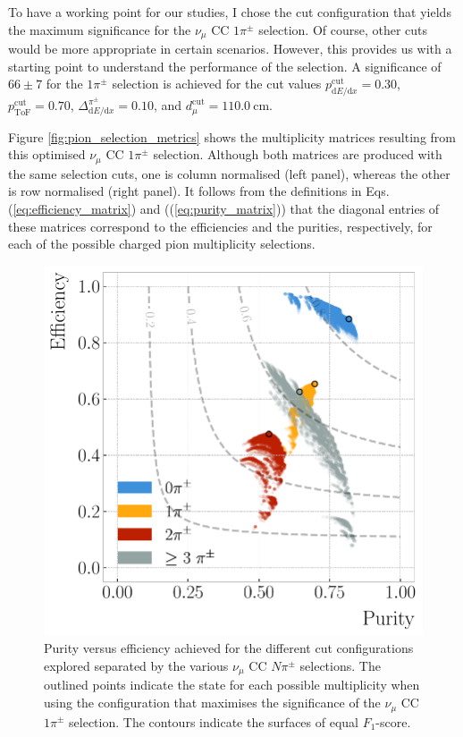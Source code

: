 To have a working point for our studies, I chose the cut configuration that yields the maximum significance for the $\nu_{\mu}$ CC $1\pi^{\pm}$ selection. Of course, other cuts would be more appropriate in certain scenarios. However, this provides us with a starting point to understand the performance of the selection. A significance of $66\pm7$ for the $1\pi^{\pm}$ selection is achieved for the cut values $p^{\mathrm{cut}}_{\mathrm{d}E/\mathrm{d}x} = 0.30$, $p^{\mathrm{cut}}_{\mathrm{ToF}} = 0.70$, $\Delta^{\pi^{\pm}}_{\mathrm{d}E/\mathrm{d}x} = 0.10$, and $d^{\mathrm{cut}}_{\mu} = 110.0~\mathrm{cm}$.

Figure \ref{fig:pion_selection_metrics} shows the multiplicity matrices resulting from this optimised $\nu_{\mu}$ CC $1\pi^{\pm}$ selection. Although both matrices are produced with the same selection cuts, one is column normalised (left panel), whereas the other is row normalised (right panel). It follows from the definitions in Eqs. (\ref{eq:efficiency_matrix}) and ((\ref{eq:purity_matrix})) that the diagonal entries of these matrices correspond to the efficiencies and the purities, respectively, for each of the possible charged pion multiplicity selections.

\begin{figure}[t]
    \centering
    \includegraphics[width=.70\linewidth]{Images/GAr_selection/pion_selection_all_in_one_purity_vs_efficiency.pdf}
    \caption[Purity versus efficiency achieved for the different cut configurations explored separated by the various $\nu_{\mu}$ CC $N\pi^{\pm}$ selections.]{Purity versus efficiency achieved for the different cut configurations explored separated by the various $\nu_{\mu}$ CC $N\pi^{\pm}$ selections. The outlined points indicate the state for each possible multiplicity when using the configuration that maximises the significance of the $\nu_{\mu}$ CC $1\pi^{\pm}$ selection. The contours indicate the surfaces of equal $F_{1}$-score.}
    \label{fig:pion_purity_vs_efficiency}
\end{figure}

